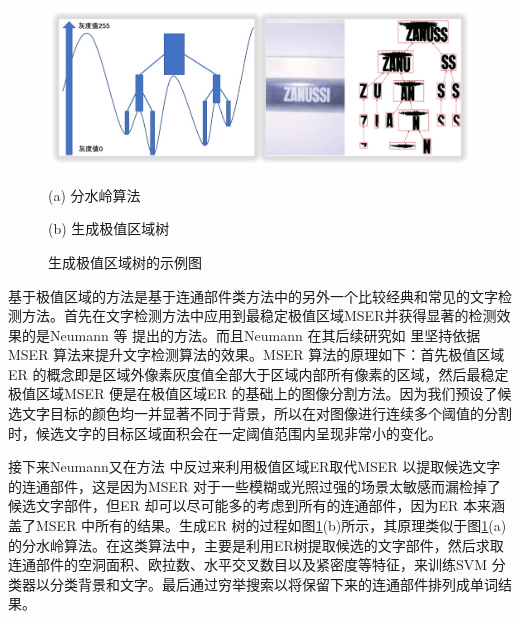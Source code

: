     \begin{figure}[!h]
    \centering
    \includegraphics[width=\textwidth]{./figures/c2_er_tree.jpg}
    \begin{minipage}[t]{0.48\linewidth}
    \centerline{ \small (a) 分水岭算法}
    \end{minipage}
    \begin{minipage}[t]{0.48\linewidth}
    \centerline{ \small (b) 生成极值区域树}
    \end{minipage}
    \caption{生成极值区域树的示例图}
    \label{fig.c2_er_tree}
    \end{figure}

    基于极值区域的方法是基于连通部件类方法中的另外一个比较经典和常见的文字检测方法。首先在文字检测方法中应用到最稳定极值区域MSER并获得显著的检测效果的是Neumann 等\cite{Neumann2010A} 提出的方法。而且Neumann 在其后续研究如\cite{Neumann2011Text} 里坚持依据MSER 算法来提升文字检测算法的效果。MSER 算法的原理如下：首先极值区域ER 的概念即是区域外像素灰度值全部大于区域内部所有像素的区域，然后最稳定极值区域MSER 便是在极值区域ER 的基础上的图像分割方法。因为我们预设了候选文字目标的颜色均一并显著不同于背景，所以在对图像进行连续多个阈值的分割时，候选文字的目标区域面积会在一定阈值范围内呈现非常小的变化。

    接下来Neumann又在方法\cite{Neumann2012Real} 中反过来利用极值区域ER取代MSER 以提取候选文字的连通部件，这是因为MSER 对于一些模糊或光照过强的场景太敏感而漏检掉了候选文字部件，但ER 却可以尽可能多的考虑到所有的连通部件，因为ER 本来涵盖了MSER 中所有的结果。生成ER 树的过程如图\ref{fig.c2_er_tree}(b)所示，其原理类似于图\ref{fig.c2_er_tree}(a)的分水岭算法。在这类算法中，主要是利用ER树提取候选的文字部件，然后求取连通部件的空洞面积、欧拉数、水平交叉数目以及紧密度等特征，来训练SVM 分类器以分类背景和文字。最后通过穷举搜索以将保留下来的连通部件排列成单词结果。

